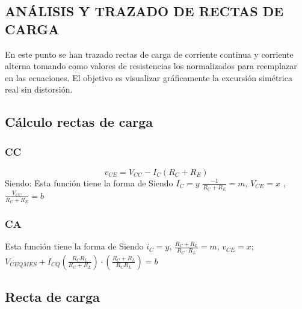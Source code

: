 \begin{multicols}{2}
\section{ANÁLISIS Y TRAZADO DE RECTAS DE CARGA}
        \sangria{} En este punto se han trazado rectas de carga de corriente continua y corriente alterna tomando como valores de resistencias los normalizados para reemplazar en las ecuaciones. El objetivo es visualizar gráficamente la excursión simétrica real sin distorsión.

        \subsection{Cálculo rectas de carga}
        \subsubsection{CC}
        \[
        v_{CE} = V_{CC} - I_C (R_C + R_E)
        \]
        Siendo:
        Esta función tiene la forma de
        	Siendo $I_C=y$ $\frac{-1}{R_C+R_E}=m$, $V_{CE}=x$ , $\frac{V_{CC}}{R_C + R_E}=b$


        \subsubsection{CA}
        Esta función tiene la forma de
        	Siendo $i_C=y$, $\frac{R_C + R_L}{R_C \cdot R_L}=m$, $v_{CE}=x$; $V_{CEQMES} + I_{CQ}(\frac{R_CR_L}{R_C + R_L}) \cdot (\frac{R_C + R_L}{R_CR_L})=b$
\end{multicols}

\subsection{Recta de carga}

